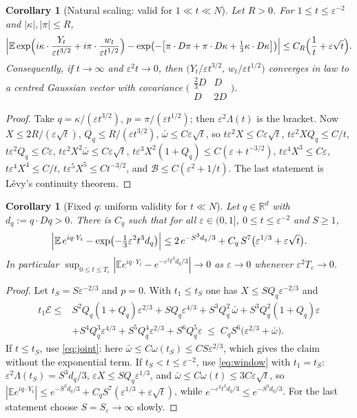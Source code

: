 \documentclass[11pt]{article}
\newcommand{\E}{\mathbb{E}}
\newcommand{\eps}{\varepsilon}
\newtheorem{corollary}[theorem]{Corollary}
\theoremstyle{remark}
\begin{document}
\begin{corollary}[Natural scaling: valid for $1\ll t\ll N$]\label{cor:natural}
Let $R>0$. For $1\le t\le\eps^{-2}$ and $|\kappa|,|\pi|\le R$,
\[
  \Bigl|\E\exp\Bigl(i\kappa\cdot\frac{Y_t}{\eps t^{3/2}}
     + i\pi\cdot\frac{w_t}{\eps t^{1/2}}\Bigr)
   - \exp\bigl(-\bigl[\pi\cdot D\pi + \pi\cdot D\kappa
     + \tfrac13\kappa\cdot D\kappa\bigr]\bigr)\Bigr|
  \le C_R\Bigl(\frac1t + \eps\sqrt t\Bigr).
\]
Consequently, if $t\to\infty$ and $\eps^2t\to0$, then
$\bigl(Y_t/\eps t^{3/2},\,w_t/\eps t^{1/2}\bigr)$ converges in law to a
centred Gaussian vector with covariance
$\bigl(\begin{smallmatrix}\frac23D & D\\ D & 2D\end{smallmatrix}\bigr)$.
\end{corollary}

\begin{proof}
Take $q = \kappa/(\eps t^{3/2})$, $p = \pi/(\eps t^{1/2})$; then
$\eps^2\Lambda(t)$ is the bracket. Now $X\le2R/(\eps\sqrt t)$,
$Q_q\le R/(\eps t^{3/2})$, $\bar\omega\le C\eps\sqrt t$, so
$t\eps^2X\le C\eps\sqrt t$, $t\eps^2XQ_q\le C/t$, $t\eps^2Q_q\le C\eps$,
$t\eps^2X^2\bar\omega\le C\eps\sqrt t$,
$t\eps^3X^2(1+Q_q)\le C(\eps + t^{-3/2})$, $t\eps^4X^3\le C\eps$,
$t\eps^4X^4\le C/t$, $t\eps^5X^5\le Ct^{-3/2}$, and
$\mathcal{B}\le C(\eps^2 + 1/t)$. The last statement is L\'evy's continuity
theorem.
\end{proof}

\begin{corollary}[Fixed $q$: uniform validity for $t\ll N$]\label{cor:uniform}
Let $q\in\mathbb{R}^d$ with $d_q := q\cdot Dq>0$. There is $C_q$ such that for
all $\eps\in(0,1]$, $0\le t\le\eps^{-2}$ and $S\ge1$,
\[
  \Bigl|\E\,e^{iq\cdot Y_t} - \exp\bigl(-\tfrac13\eps^2t^3d_q\bigr)\Bigr|
  \le 2\,e^{-S^3d_q/3} + C_q\,S^7\bigl(\eps^{1/3} + \eps\sqrt t\bigr).
\]
In particular
$\sup_{0\le t\le T_\eps}|\E e^{iq\cdot Y_t} - e^{-\eps^2t^3d_q/3}|\to0$ as
$\eps\to0$ whenever $\eps^2T_\eps\to0$.
\end{corollary}

\begin{proof}
Let $t_S = S\eps^{-2/3}$ and $p=0$. With $t_1\le t_S$ one has
$X\le SQ_q\eps^{-2/3}$ and
\begin{align*}
  t_1\mathcal{E}\le{}& S^2Q_q(1+Q_q)\eps^{2/3} + SQ_q\eps^{4/3}
   + S^3Q_q^2\,\bar\omega + S^3Q_q^2(1+Q_q)\eps \\
  & + S^4Q_q^3\eps^{4/3} + S^5Q_q^4\eps^{2/3} + S^6Q_q^5\eps
   \;\le\; C_qS^6\bigl(\eps^{2/3} + \bar\omega\bigr).
\end{align*}
If $t\le t_S$, use \eqref{eq:joint}: here
$\bar\omega\le C\omega(t_S)\le CS\eps^{2/3}$, which gives the claim without
the exponential term. If $t_S<t\le\eps^{-2}$, use \eqref{eq:window} with
$t_1 = t_S$: $\eps^2\Lambda(t_S) = S^3d_q/3$,
$\eps X\le SQ_q\eps^{1/3}$, and $\bar\omega\le C\omega(t)\le3C\eps\sqrt t$, so
$|\E e^{iq\cdot Y_t}|\le e^{-S^3d_q/3} + C_qS^7(\eps^{1/3}+\eps\sqrt t)$, while
$e^{-\eps^2t^3d_q/3}\le e^{-S^3d_q/3}$. For the last statement choose
$S = S_\eps\to\infty$ slowly.
\end{proof}
\end{document}
